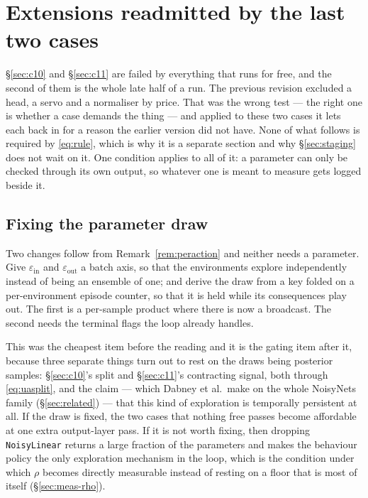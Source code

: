 \documentclass{article}
\begin{document}
\section{Extensions readmitted by the last two cases}
\label{sec:readmit}

\S\ref{sec:c10} and \S\ref{sec:c11} are failed by everything that runs for free, and the second
of them is the whole late half of a run. The previous revision excluded a head, a servo and a
normaliser by price. That was the wrong test --- the right one is whether a case demands the
thing --- and applied to these two cases it lets each back in for a reason the earlier version
did not have. None of what follows is required by \eqref{eq:rule}, which is why it is a separate
section and why \S\ref{sec:staging} does not wait on it. One condition applies to all of it:
a parameter can only be checked through its own output, so whatever one is meant to measure gets
logged beside it.

\subsection{Fixing the parameter draw}
\label{sec:fixdraw}

Two changes follow from Remark~\ref{rem:peraction} and neither needs a parameter. Give
$\varepsilon_{\mathrm{in}}$ and $\varepsilon_{\mathrm{out}}$ a batch axis, so that the
environments explore independently instead of being an ensemble of one; and derive the draw from
a key folded on a per-environment episode counter, so that it is held while its consequences play
out. The first is a per-sample product where there is now a broadcast. The second needs the
terminal flags the loop already handles.

This was the cheapest item before the reading and it is the gating item after it, because three
separate things turn out to rest on the draws being posterior samples: \S\ref{sec:c10}'s split
and \S\ref{sec:c11}'s contracting signal, both through \eqref{eq:uasplit}, and the claim ---
which Dabney et al.\ make on the whole NoisyNets family (\S\ref{sec:related}) --- that this kind
of exploration is temporally persistent at all. If the draw is fixed, the two cases that nothing
free passes become affordable at one extra output-layer pass. If it is not worth fixing, then
dropping \texttt{NoisyLinear} returns a large fraction of the parameters and makes the behaviour
policy the
only exploration mechanism in the loop, which is the condition under which $\rho$ becomes
directly measurable instead of resting on a floor that is most of itself
(\S\ref{sec:meas-rho}).
\end{document}
